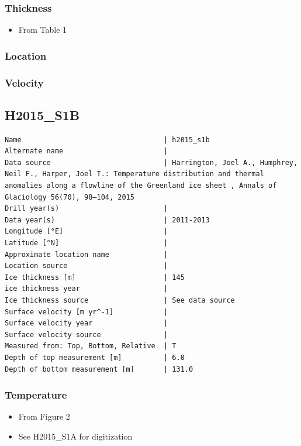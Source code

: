 \documentclass[article,a4paper,times,11pt,twoside]{article}
\begin{document}
\subsubsection{Thickness}
\label{sec:org03b72f2}

\begin{itemize}
\item From \textcite{harrington_2015} Table 1
\end{itemize}

\subsubsection{Location}
\label{sec:orgfe9c68a}

\subsubsection{Velocity}
\label{sec:org7828e3d}
\clearpage
\subsection{H2015\_S1B}
\label{sec:org171520b}
\begin{verbatim}
Name                                  | h2015_s1b
Alternate name                        | 
Data source                           | Harrington, Joel A., Humphrey, Neil F., Harper, Joel T.: Temperature distribution and thermal anomalies along a flowline of the Greenland ice sheet , Annals of Glaciology 56(70), 98–104, 2015 
Drill year(s)                         | 
Data year(s)                          | 2011-2013
Longitude [°E]                        | 
Latitude [°N]                         | 
Approximate location name             | 
Location source                       | 
Ice thickness [m]                     | 145
ice thickness year                    | 
Ice thickness source                  | See data source
Surface velocity [m yr^-1]            | 
Surface velocity year                 | 
Surface velocity source               | 
Measured from: Top, Bottom, Relative  | T
Depth of top measurement [m]          | 6.0
Depth of bottom measurement [m]       | 131.0
\end{verbatim}

\subsubsection{Temperature}
\label{sec:org179ae3a}

\begin{itemize}
\item From \textcite{harrington_2015} Figure 2
\item See H2015\_S1A for digitization
\end{itemize}
\end{document}
